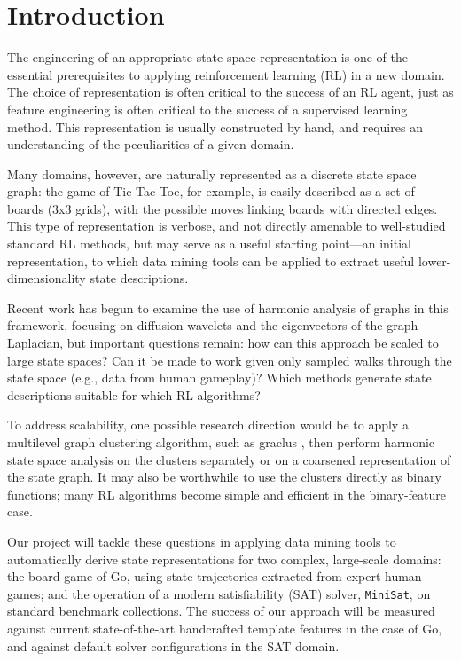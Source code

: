 \section{Introduction}

The engineering of an appropriate state space representation is one of the
essential prerequisites to applying reinforcement learning (RL) in a new
domain. The choice of representation is often critical to the success of an RL
agent, just as feature engineering is often critical to the success of a
supervised learning method. This representation is usually constructed by hand,
and requires an understanding of the peculiarities of a given domain.

Many domains, however, are naturally represented as a discrete state space
graph: the game of Tic-Tac-Toe, for example, is easily described as a set of
boards (3x3 grids), with the possible moves linking boards with directed edges.
This type of representation is verbose, and not directly amenable to
well-studied standard RL methods, but may serve as a useful starting point---an
initial representation, to which data mining tools can be applied to extract
useful lower-dimensionality state descriptions.

Recent work \citep{Wang2009Multiscale,Mahadevan2006Value,Coifman06Diffusion} has 
begun to examine the use of harmonic analysis of graphs in this framework, 
focusing on diffusion wavelets and the eigenvectors of the graph Laplacian, but 
important questions remain: how can this approach be scaled to large state spaces? 
Can it be made to work given only sampled walks through the state space (e.g., data 
from human gameplay)? Which methods generate state descriptions suitable for which 
RL algorithms?

To address scalability, one possible research direction would be to apply a
multilevel graph clustering algorithm, such as graclus
\citep{Dhillon07weightedgraph}, then perform harmonic state space analysis on
the clusters separately or on a coarsened representation of the state graph. It
may also be worthwhile to use the clusters directly as binary functions; many
RL algorithms become simple and efficient in the binary-feature case.  

Our project will tackle these questions in applying data mining tools to
automatically derive state representations for two complex, large-scale
domains: the board game of Go, using state trajectories extracted from expert
human games; and the operation of a modern satisfiability (SAT) solver,
\texttt{MiniSat}, on standard benchmark collections. The success of our
approach will be measured against current state-of-the-art handcrafted template
features \citep{Silver2007Shape} in the case of Go, and against default solver
configurations in the SAT domain. 

